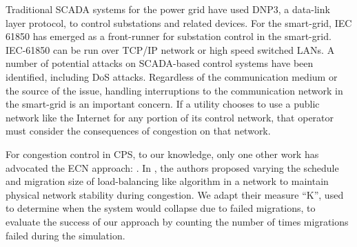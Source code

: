 Traditional \ac{SCADA} systems for the power grid have used \ac{DNP3}, a data-link layer protocol, to control substations and related devices\cite{dnp3}.
For the smart-grid, IEC 61850 has emerged as a front-runner for substation control in the smart-grid\cite{iec61850-1}\cite{iec61850-2}\cite{iec61850-3}.
IEC-61850 can be run over TCP/IP network or high speed switched LANs\cite{iec61850-3}.
A number of potential attacks on \ac{SCADA}-based control systems have been identified\cite{smartgrid-security}\cite{smartgrid-attacks}, including \ac{DoS} attacks\cite{scada-attack-dos}\cite{dnp3-attack}.
Regardless of the communication medium or the source of the issue, handling interruptions to the communication network in the smart-grid is an important concern.
If a utility chooses to use a public network like the Internet for any portion of its control network, that operator must consider the consequences of congestion on that network\cite{intelligent-control}\cite{plc-communication}\cite{wireless-congestion}.

For congestion control in \ac{CPS}, to our knowledge, only one other work has advocated the \ac{ECN} approach: \cite{ecn-cloudhari}.
In \cite{ecn-cloudhari}, the authors proposed varying the schedule and migration size of load-balancing like algorithm in a network to maintain physical network stability during congestion.
We adapt their measure ``K'', used to determine when the system would collapse due to failed migrations, to evaluate the success of our approach by counting the number of times migrations failed during the simulation.

